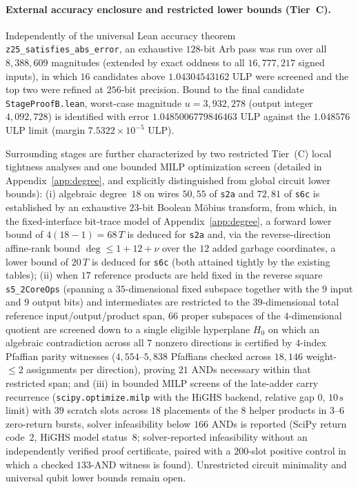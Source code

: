 \documentclass[11pt,a4paper]{article}
\theoremstyle{definition}
\theoremstyle{remark}
\begin{document}
\paragraph{External accuracy enclosure and restricted lower bounds (Tier~C).}
Independently of the universal Lean accuracy theorem \texttt{z25\_satisfies\_abs\_error}, an exhaustive \(128\)-bit Arb pass was run over all \(8{,}388{,}609\) magnitudes (extended by exact oddness to all \(16{,}777{,}217\) signed inputs), in which \(16\) candidates above \(1.04304543162\) ULP were screened and the top two were refined at \(256\)-bit precision. Bound to the final candidate \texttt{StageProofB.lean}, worst-case magnitude \(u = 3{,}932{,}278\) (output integer \(4{,}092{,}728\)) is identified with error \(1.0485006779846463\) ULP against the \(1.048576\) ULP limit (margin \(7.5322 \times 10^{-5}\) ULP).

Surrounding stages are further characterized by two restricted Tier~(C) local tightness analyses and one bounded MILP optimization screen (detailed in Appendix~\ref{app:degree}, and explicitly distinguished from global circuit lower bounds): (i) algebraic degree~\(18\) on wires \(50, 55\) of \texttt{s2a} and \(72, 81\) of \texttt{s6c} is established by an exhaustive \(23\)-bit Boolean M\"obius transform, from which, in the fixed-interface bit-trace model of Appendix~\ref{app:degree}, a forward lower bound of \(4(18-1) = 68\,T\) is deduced for \texttt{s2a} and, via the reverse-direction affine-rank bound \(\deg \le 1 + 12 + \nu\) over the \(12\) added garbage coordinates, a lower bound of \(20\,T\) is deduced for \texttt{s6c} (both attained tightly by the existing tables); (ii) when \(17\) reference products are held fixed in the reverse square \texttt{s5\_2CoreOps} (spanning a \(35\)-dimensional fixed subspace together with the \(9\) input and \(9\) output bits) and intermediates are restricted to the \(39\)-dimensional total reference input/output/product span, \(66\) proper subspaces of the \(4\)-dimensional quotient are screened down to a single eligible hyperplane \(H_0\) on which an algebraic contradiction across all \(7\) nonzero directions is certified by \(4\)-index Pfaffian parity witnesses (\(4{,}554\text{--}5{,}838\) Pfaffians checked across \(18{,}146\) weight-\(\le 2\) assignments per direction), proving \(21\) ANDs necessary within that restricted span; and (iii) in bounded MILP screens of the late-adder carry recurrence (\texttt{scipy.optimize.milp} with the HiGHS backend, relative gap \(0\), \(10\,\mathrm{s}\) limit) with \(39\) scratch slots across \(18\) placements of the \(8\) helper products in \(3\text{--}6\) zero-return bursts, solver infeasibility below \(166\) ANDs is reported (SciPy return code~\(2\), HiGHS model status~\(8\); solver-reported infeasibility without an independently verified proof certificate, paired with a \(200\)-slot positive control in which a checked \(133\)-AND witness is found). Unrestricted circuit minimality and universal qubit lower bounds remain open.
\end{document}
